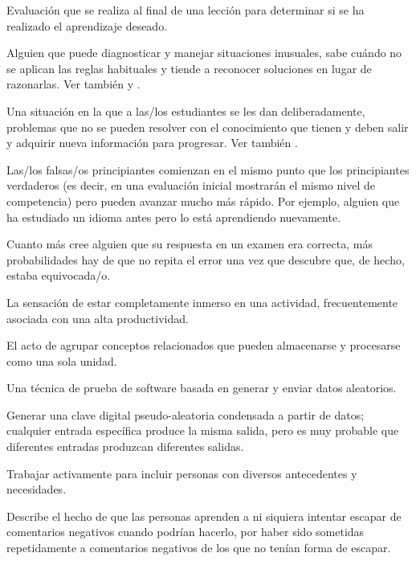 \begin{description}
 Evaluación que se realiza al final de una 
lección para determinar si se ha realizado el aprendizaje deseado.

 Alguien que puede diagnosticar y manejar situaciones inusuales, 
sabe cuándo no se aplican las reglas habituales y tiende a reconocer soluciones en lugar de razonarlas.
Ver también 
y .

 Una situación en la que a las/los estudiantes se les dan deliberadamente, 
problemas que no se pueden resolver con el conocimiento que tienen y deben salir y adquirir nueva información para progresar.
Ver también .

 Las/los falsas/os principiantes comienzan en el mismo punto que los principiantes 
verdaderos (es decir, en una evaluación inicial mostrarán el mismo nivel de competencia) pero pueden avanzar mucho más rápido.
Por ejemplo, alguien que ha estudiado un idioma antes pero lo está aprendiendo nuevamente. 

 Cuanto más cree alguien
que su respuesta en un examen era correcta, más probabilidades hay de que no
repita el error una vez que descubre que, de hecho, estaba equivocada/o.

 La sensación de estar completamente inmerso en una actividad,
frecuentemente asociada con una alta productividad.

 El acto de agrupar conceptos relacionados
que pueden almacenarse y procesarse como una sola unidad.

 Una técnica de prueba de software
basada en generar y enviar datos aleatorios.

 Generar una clave digital pseudo-aleatoria condensada a partir de datos; cualquier entrada específica produce la misma salida, pero es muy probable que diferentes entradas produzcan diferentes salidas.

 Trabajar activamente para incluir
personas con diversos antecedentes y necesidades.

 Describe el hecho de que las personas aprenden a ni siquiera intentar escapar de comentarios negativos cuando podrían hacerlo, por haber sido sometidas repetidamente a 
comentarios negativos de los que no tenían forma de escapar.


\end{description}
